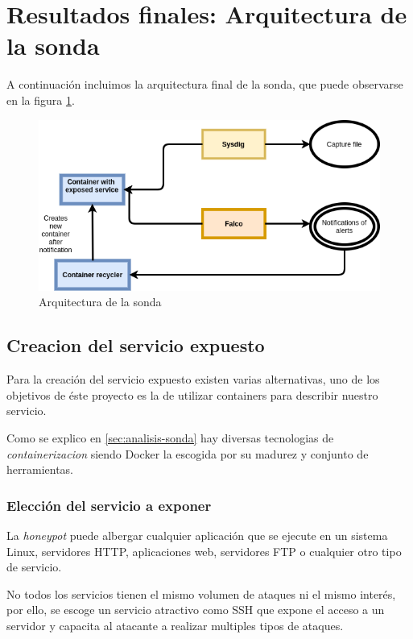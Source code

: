 \section{Resultados finales: Arquitectura de la sonda}

A continuación incluimos la arquitectura final de la sonda, que puede observarse en la figura \ref{fig:arquitectura-sonda}.

\begin{figure}[h]
    \centering
      \includegraphics[scale=0.5]{images/probe_architecture}
    \caption{Arquitectura de la sonda}
    \label{fig:arquitectura-sonda}
  \end{figure}

\subsection{Creacion del servicio expuesto}

Para la creación del servicio expuesto existen varias alternativas, uno de los objetivos de éste proyecto es la de utilizar
containers para describir nuestro servicio.

Como se explico en \ref{sec:analisis-sonda} hay diversas tecnologias de \emph{containerizacion} siendo Docker la escogida
por su madurez y conjunto de herramientas. 

\subsubsection{Elección del servicio a exponer}

La \emph{honeypot} puede albergar cualquier aplicación que se ejecute en un sistema Linux, servidores HTTP, aplicaciones
web, servidores FTP o cualquier otro tipo de servicio.

No todos los servicios tienen el mismo volumen de ataques ni el mismo interés, por ello, se escoge un servicio atractivo como SSH que 
expone el acceso a un servidor y capacita al atacante a realizar multiples tipos de ataques.

